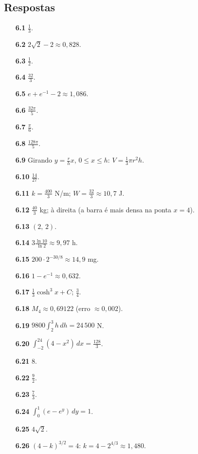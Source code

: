 \subsection*{Respostas}
{\small\begin{multicols}{2}\raggedright
\begin{itemize}[leftmargin=2.7em,labelsep=0.5em,itemsep=1pt]
\item[\textbf{6.1}] $\tfrac13$.
\item[\textbf{6.2}] $2\sqrt2-2\approx0{,}828$.
\item[\textbf{6.3}] $\tfrac12$.
\item[\textbf{6.4}] $\tfrac{32}3$.
\item[\textbf{6.5}] $e+e^{-1}-2\approx1{,}086$.
\item[\textbf{6.6}] $\tfrac{32\pi}5$.
\item[\textbf{6.7}] $\tfrac\pi6$.
\item[\textbf{6.8}] $\tfrac{128\pi}5$.
\item[\textbf{6.9}] Girando $y=\tfrac rhx$, $0\le x\le h$: $V=\tfrac13\pi r^2h$.
\item[\textbf{6.10}] $\tfrac{14}{27}$.
\item[\textbf{6.11}] $k=\tfrac{400}3$ N/m; $W=\tfrac{32}3\approx10{,}7$ J.
\item[\textbf{6.12}] $\tfrac{40}3$ kg; à direita (a barra é mais densa na ponta $x=4$).
\item[\textbf{6.13}] $(2,\,2)$.
\item[\textbf{6.14}] $3\tfrac{\ln10}{\ln2}\approx9{,}97$ h.
\item[\textbf{6.15}] $200\cdot2^{-30/8}\approx14{,}9$ mg.
\item[\textbf{6.16}] $1-e^{-1}\approx0{,}632$.
\item[\textbf{6.17}] $\tfrac13\cosh^3x+C$; $\tfrac34$.
\item[\textbf{6.18}] $M_4\approx0{,}69122$ (erro $\approx0{,}002$).
\item[\textbf{6.19}] $9800\int_2^3h\,dh=24\,500$ N.
\item[\textbf{6.20}] $\int_{-2}^24(4-x^2)\,dx=\tfrac{128}3$.
\item[\textbf{6.21}] $8$.
\item[\textbf{6.22}] $\tfrac92$.
\item[\textbf{6.23}] $\tfrac73$.
\item[\textbf{6.24}] $\int_0^1(e-e^y)\,dy=1$.
\item[\textbf{6.25}] $4\sqrt2$.
\item[\textbf{6.26}] $(4-k)^{3/2}=4$: $k=4-2^{4/3}\approx1{,}480$.

\end{itemize}
\end{multicols}}
